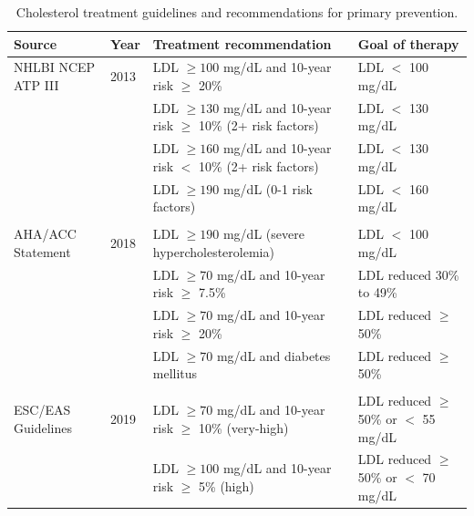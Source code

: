 \documentclass[12pt]{article}
\begin{document}
\begin{appendix}
\begin{landscape}
    \begin{table}[H]
        \centering
        \caption{Cholesterol treatment guidelines and recommendations for primary prevention.}
        \tiny{
        \begin{threeparttable}
        \begin{tabular}{llll}
            \toprule
            Source & Year & Treatment recommendation & Goal of therapy\\
            \midrule  
            NHLBI NCEP ATP III \cite{noauthor_third_2002} & 2013 & LDL $\geq 100$ mg/dL and 10-year risk\tnote{*} \hspace{1pt}  $\geq$ 20\%  & LDL $<$ 100 mg/dL \\
            & & LDL $\geq 130$ mg/dL and 10-year risk\tnote{*} \hspace{1pt}  $\geq$ 10\% (2+ risk factors) & LDL $<$ 130 mg/dL  \\
            & & LDL $\geq 160$ mg/dL and 10-year risk\tnote{*} \hspace{1pt}  $<$ 10\% (2+ risk factors) & LDL $<$ 130 mg/dL  \\
            & & LDL $\geq 190$ mg/dL (0-1 risk factors) & LDL $<$ 160 mg/dL \\
            & & & \\
            AHA/ACC Statement \cite{grundy_scott_m_2018_2019} & 2018 & LDL $\geq 190$ mg/dL (severe hypercholesterolemia) & LDL $<$ 100 mg/dL \\
            & & LDL $\geq 70$ mg/dL and 10-year risk\tnote{*} \hspace{1pt}  $\geq$ 7.5\%  & LDL reduced 30\% to 49\%\\
            & & LDL $\geq 70$ mg/dL and 10-year risk\tnote{*} \hspace{1pt}  $\geq$ 20\% & LDL reduced $\geq$ 50\%\\
            & & LDL $\geq 70$ mg/dL and diabetes mellitus & LDL reduced $\geq$ 50\% \\
            & & & \\
            ESC/EAS Guidelines \cite{mach_2019_2020} & 2019 & LDL $\geq 70$ mg/dL and 10-year risk\tnote{\textdagger} \hspace{1pt} $\geq$ 10\% (very-high) & LDL reduced $\geq$ 50\% or $<$ 55 mg/dL \\
            & & LDL $\geq 100$ mg/dL and 10-year risk\tnote{\textdagger} \hspace{1pt}  $\geq$ 5\% (high) & LDL reduced $\geq$ 50\% or $<$ 70 mg/dL \\

\end{tabular}
\end{threeparttable}}
\end{table}
\end{landscape}
\end{appendix}
\end{document}
